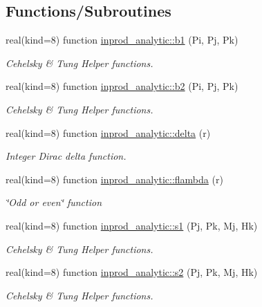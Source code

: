 \subsection*{Functions/\+Subroutines}
\begin{DoxyCompactItemize}
\item 
real(kind=8) function \hyperlink{namespaceinprod__analytic_a65ce3c65ea7e796a09b702d3c0f63fe0}{inprod\+\_\+analytic\+::b1} (Pi, Pj, Pk)
\begin{DoxyCompactList}\small\item\em Cehelsky \& Tung Helper functions. \end{DoxyCompactList}\item 
real(kind=8) function \hyperlink{namespaceinprod__analytic_ac3804db9421130d611b222d8b12c1882}{inprod\+\_\+analytic\+::b2} (Pi, Pj, Pk)
\begin{DoxyCompactList}\small\item\em Cehelsky \& Tung Helper functions. \end{DoxyCompactList}\item 
real(kind=8) function \hyperlink{namespaceinprod__analytic_ac500ef2ae885d78a4f4558392a92fd0c}{inprod\+\_\+analytic\+::delta} (r)
\begin{DoxyCompactList}\small\item\em Integer Dirac delta function. \end{DoxyCompactList}\item 
real(kind=8) function \hyperlink{namespaceinprod__analytic_a7e49045b5dd4cf8d0a4eb096570e8f5c}{inprod\+\_\+analytic\+::flambda} (r)
\begin{DoxyCompactList}\small\item\em \char`\"{}\+Odd or even\char`\"{} function \end{DoxyCompactList}\item 
real(kind=8) function \hyperlink{namespaceinprod__analytic_a90a2b9840d6c77f13aaadd7e0537800c}{inprod\+\_\+analytic\+::s1} (Pj, Pk, Mj, Hk)
\begin{DoxyCompactList}\small\item\em Cehelsky \& Tung Helper functions. \end{DoxyCompactList}\item 
real(kind=8) function \hyperlink{namespaceinprod__analytic_a319a35a215ad426474c9a2beb4d85bbb}{inprod\+\_\+analytic\+::s2} (Pj, Pk, Mj, Hk)
\begin{DoxyCompactList}\small\item\em Cehelsky \& Tung Helper functions. \end{DoxyCompactList}\item 

\end{DoxyCompactItemize}
